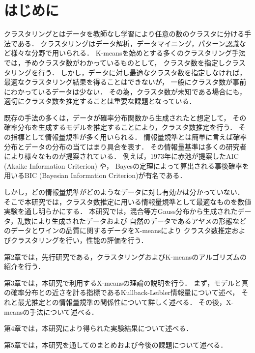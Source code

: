 \section{はじめに}
クラスタリングとはデータを教師なし学習により任意の数のクラスタに分ける手法である．
クラスタリングはデータ解析，データマイニング，パターン認識など様々な分野で用いられる．
K-meansを始めとする多くのクラスタリング手法では，予めクラスタ数がわかっているものとして，
クラスタ数を指定しクラスタリングを行う．
しかし，データに対し最適なクラスタ数を指定しなければ，最適なクラスタリング結果を得ることはできないが，
一般にクラスタ数が事前にわかっているデータは少ない．
その為，クラスタ数が未知である場合にも，適切にクラスタ数を推定することは重要な課題となっている．

既存の手法の多くは，データが確率分布関数から生成されたと想定して，
その確率分布を生成するモデルを推定することにより，クラスタ数推定を行う．
その指標として情報量規準が多く用いられる．
情報量規準とは簡単に言えば確率分布とデータの分布の当てはまり具合を表す．
その情報量基準は多くの研究者により様々なものが提案されている．
例えば，1973年に赤池が提案したAIC (Akaike Information Criterion) や，
Bayesの定理によって算出される事後確率を用いるBIC (Bayesian Information Criterion)が有名である．

しかし，どの情報量規準がどのようなデータに対し有効かは分かっていない．
そこで本研究では，クラスタ数推定に用いる情報量規準として最適なものを数値実験を通し明らかにする．
本研究では，混合等方Gauss分布から生成されたデータ，乱数により生成されたデータおよび
自然のデータであるアヤメの形態などのデータとワインの品質に関するデータをX-meansにより
クラスタ数推定およびクラスタリングを行い，性能の評価を行う．

第2章では，先行研究である，クラスタリングおよびK-meansのアルゴリズムの紹介を行う．

第3章では，本研究で利用するX-meansの理論の説明を行う．
まず，モデルと真の確率分布との近さを計る指標であるKullback-Leibler情報量について述べ，
それと最尤推定との情報量規準の関係性について詳しく述べる．
その後，X-meansの手法について述べる．

第4章では，本研究により得られた実験結果について述べる．

第5章では，本研究を通してのまとめおよび今後の課題について述べる．

